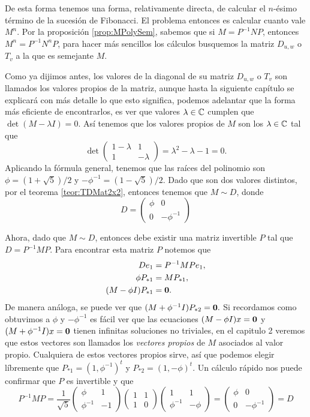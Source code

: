 De esta forma tenemos una forma, relativamente directa, de calcular el $n$-ésimo término de la sucesión de Fibonacci. El problema entonces es calcular cuanto vale $M^n$. Por la proposición \ref{prop:MPolySem}, sabemos que si $M = P^{-1}NP$, entonces $M^n = P^{-1} N^n P$, para hacer más sencillos los cálculos busquemos la matriz $D_{u,w}$ o $T_v$ a la que es semejante $M$.

Como ya dijimos antes, los valores de la diagonal de su matriz $D_{u,w}$ o $T_v$ son llamados los valores propios de la matriz, aunque hasta la siguiente capítulo se explicará con más detalle lo que esto significa, podemos adelantar que la forma más eficiente de encontrarlos, es ver que valores $\lambda \in \mathbb{C}$ cumplen que $\det(M-\lambda I) = 0$. Así tenemos que los valores propios de $M$ son los $\lambda \in \mathbb{C}$ tal que
\[
  \det\begin{pmatrix} 1-\lambda & 1 \\ 1 & -\lambda \end{pmatrix} = \lambda^2 - \lambda - 1 = 0.
\]
Aplicando la fórmula general, tenemos que las raíces del polinomio son $\phi = (1+\sqrt{5})/2$ y $-\phi^{-1} = (1-\sqrt{5})/2$. Dado que son dos valores distintos, por el teorema \ref{teor:TDMat2x2}, entonces tenemos que $M \sim D$, donde
\[
  D = \begin{pmatrix}
    \phi & 0 \\
    0 & -\phi^{-1}
  \end{pmatrix}
\]

Ahora, dado que $M \sim D$, entonces debe existir una matriz invertible $P$ tal que $D = P^{-1} M P$. Para encontrar esta matriz $P$ notemos que
\begin{align*}
  De_1 &=  P^{-1} M Pe_1, \\
  \phi P_{*1} &= M P_{*1}, \\
  (M - \phi I)P_{*1} &= \mathbf{0}.
\end{align*}
De manera análoga, se puede ver que $(M + \phi^{-1} I)P_{*2} = \mathbf{0}.$ Si recordamos como obtuvimos a $\phi$ y $-\phi^{-1}$ es fácil ver que las ecuaciones $(M - \phi I)x = \mathbf{0}$ y $(M + \phi^{-1} I)x = \mathbf{0}$ tienen infinitas soluciones no triviales, en el capitulo 2 veremos que estos vectores son llamados los \emph{vectores propios} de $M$ asociados al valor propio. Cualquiera de estos vectores propios sirve, así que podemos elegir líbremente que $P_{*1} = (1, \phi^{-1})^t$ y $P_{*2} = (1, -\phi)^t$. Un cálculo rápido nos puede confirmar que $P$ es invertible y que
\[
  P^{-1} M P = 
  \frac{1}{\sqrt{5}}\begin{pmatrix} \phi & 1 \\ \phi^{-1} & -1 \end{pmatrix}
  \begin{pmatrix} 1 & 1 \\ 1 & 0 \end{pmatrix}
  \begin{pmatrix} 1 & 1 \\ \phi^{-1} & -\phi \end{pmatrix} =
  \begin{pmatrix} \phi & 0 \\ 0 & -\phi^{-1} \end{pmatrix} = D
\]

